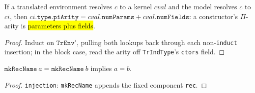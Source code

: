 \begin{theorem}
\label{thm:tr-env-ctor-arity}
\leanok
{}

 If a translated environment resolves $c$ to a kernel $cval$ and the model
resolves $c$ to $ci$, then $ci.\mathtt{type}.\mathtt{piArity} = cval.\mathtt{numParams} +
cval.\mathtt{numFields}$: a constructor's $\Pi$-arity is \hl{parameters plus fields}.
\end{theorem}
\begin{proof}
\leanok
{} Induct on $\mathtt{TrEnv}'$, pulling both lookups back through each
non-\texttt{induct} insertion; in the block case, read the arity off
\texttt{TrIndType}'s \texttt{ctors} field.
\end{proof}

\begin{lemma}
\label{thm:mk-rec-name-inj}
\leanok
{}

 $\mathtt{mkRecName}\ a = \mathtt{mkRecName}\ b$ implies $a = b$.
\end{lemma}
\begin{proof}
\leanok
{} \texttt{injection}: \texttt{mkRecName} appends the fixed component
\texttt{rec}.
\end{proof}

